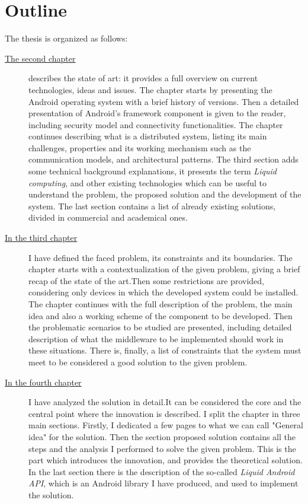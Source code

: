 \section{Outline}
%
\par The thesis is organized as follows:
%
%
\begin{description}
%
\item[{\hyperref[cap:statoarte]{The second chapter}}] describes the state of art: it provides a full overview on current technologies, ideas and issues. The chapter starts by presenting the Android operating system with a brief history of versions. Then a detailed presentation of Android's framework component is given to the reader, including security model and connectivity functionalities. The chapter continues describing what is a distributed system, listing its main challenges, properties and its working mechanism such as the communication models, and architectural patterns. The third section adds some technical background explanations, it presents the term \textit{Liquid computing}, and other existing technologies which can be useful to understand the problem, the proposed solution and the development of the system. The last section contains a list of already existing solutions, divided in commercial and academical ones.
%
\item[{\hyperref[cap:probanalysis]{In the third chapter}}] I have defined the faced problem, its constraints and its boundaries. The chapter starts with a contextualization of the given problem, giving a brief recap of the state of the art.Then some restrictions are provided, considering only devices in which the developed system could be installed. The chapter continues with the full description of the problem, the main idea and also a working scheme of the component to be developed. Then the problematic scenarios to be studied are presented, including detailed description of what the middleware to be implemented should work in these situations. There is, finally, a list of constraints that the system must meet to be considered a good solution to the given problem.

\item[{\hyperref[cap:proposedsolution]{In the fourth chapter}}] I have analyzed the solution in detail.It can be considered
the core and the central point where the innovation is described. I split the chapter in three main sections. Firstly, I dedicated a few pages to what we can call "General idea" for the solution. Then the section proposed solution contains all the steps and the analysis I performed to solve the given problem. This is the part which introduces the innovation, and provides the theoretical solution. In the last section there is the description of the so-called \textit{Liquid Android API}, which is an Android library I have produced, and used to implement the solution.


\end{description}
